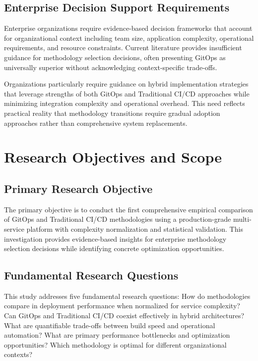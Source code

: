\subsection{Enterprise Decision Support Requirements}
Enterprise organizations require evidence-based decision frameworks that account for organizational context including team size, application complexity, operational requirements, and resource constraints. Current literature provides insufficient guidance for methodology selection decisions, often presenting GitOps as universally superior without acknowledging context-specific trade-offs.

Organizations particularly require guidance on hybrid implementation strategies that leverage strengths of both GitOps and Traditional CI/CD approaches while minimizing integration complexity and operational overhead. This need reflects practical reality that methodology transitions require gradual adoption approaches rather than comprehensive system replacements.

\section{Research Objectives and Scope}

\subsection{Primary Research Objective}
The primary objective is to conduct the first comprehensive empirical comparison of GitOps and Traditional CI/CD methodologies using a production-grade multi-service platform with complexity normalization and statistical validation. This investigation provides evidence-based insights for enterprise methodology selection decisions while identifying concrete optimization opportunities.

\subsection{Fundamental Research Questions}
This study addresses five fundamental research questions: How do methodologies compare in deployment performance when normalized for service complexity? Can GitOps and Traditional CI/CD coexist effectively in hybrid architectures? What are quantifiable trade-offs between build speed and operational automation? What are primary performance bottlenecks and optimization opportunities? Which methodology is optimal for different organizational contexts?

